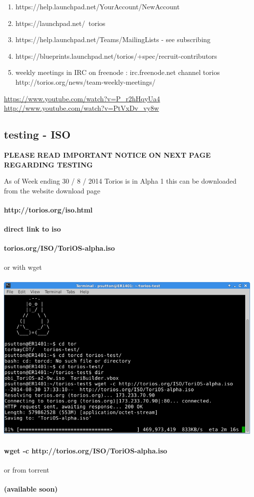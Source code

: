 \documentclass[12pt,a4paper]{book}
\begin{document}
\begin{enumerate}
\item {https://help.launchpad.net/YourAccount/NewAccount}
\item {https://launchpad.net/~torios}
\item {https://help.launchpad.net/Teams/MailingLists - see subscribing}
\item{https://blueprints.launchpad.net/torios/+spec/recruit-contributors}
\item{weekly meetings in IRC on freenode : irc.freenode.net  channel torios http://torios.org/news/team-weekly-meetings/ }

\end{enumerate}

\url{https://www.youtube.com/watch?v=P_r2hHqyUa4} \\
\url{http://www.youtube.com/watch?v=PtVxDv_vy8w} \\

\newpage
\subsection {testing - ISO}
\bf{PLEASE READ IMPORTANT NOTICE ON NEXT PAGE REGARDING TESTING}

As of Week ending 30 / 8 / 2014 Torios is in Alpha 1 this can be downloaded from the website download page  \\ \\
\textbf{http://torios.org/iso.html}\\ \\
\textbf{direct link to iso} \\ \\
\textbf{torios.org/ISO/ToriOS-alpha.iso} \\ \\
or with wget  \\ \\

\includegraphics[width=0.7\linewidth]{torios-wget-download} \\ \\
\textbf{wget -c http://torios.org/ISO/ToriOS-alpha.iso} \\ \\
or from torrent \\ \\
\textbf{(available soon)}
\end{document}
